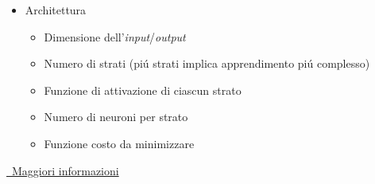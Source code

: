 \begin{frame}[t,fragile]
{{{\begin{minipage}[t]{\textwidth}
\begin{minipage}[t]{.4\textwidth}
\begin{itemize}[leftmargin=10pt,align=right]
\begin{minipage}[t]{\textwidth}
					\end{minipage}
				\end{itemize}
			\end{minipage}
			\hfill
			\begin{minipage}[t]{.5\textwidth}
				\begin{itemize}[leftmargin=10pt,align=right]
					\item[\alert{\faArrowCircleRight}] Architettura
					\begin{itemize}[leftmargin=20pt,align=right]
						\item[\alert{\faArrowCircleRight}] Dimensione dell'\emph{input}/\emph{output}
			 			\item[\alert{\faArrowCircleRight}] Numero di strati (pi\'{u} strati implica apprendimento pi\'{u} complesso)
						\item[\alert{\faArrowCircleRight}] Funzione di attivazione di ciascun strato
						\item[\alert{\faArrowCircleRight}] Numero di neuroni per strato
						\item[\alert{\faArrowCircleRight}] Funzione costo da minimizzare
					\end{itemize}
				\end{itemize}
			\end{minipage}
			\begin{center}
				\hyperlink{subsec:cnn}{\color{venis-faithful-yellow}\faExternalLinkSquare\ Maggiori informazioni}
			\end{center}		
		\end{minipage}
		}
	}
}
\end{frame}
